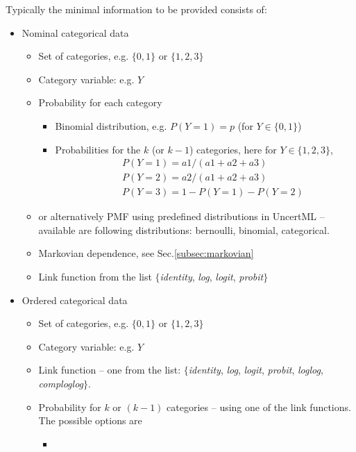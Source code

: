 Typically the minimal information to be provided consists of:
\begin{itemize}
\item
Nominal categorical data 
\begin{itemize}
\item
Set of categories, e.g. $\{0,1\}$ or $\{1,2,3\}$
\item
Category variable: e.g. $Y$
\item
Probability for each category
\begin{itemize}
\item
Binomial distribution, e.g. $P(Y=1) = p$ (for $Y \in \{0,1\}$) 
\item
Probabilities for the $k$ (or $k-1$) categories, here for $Y \in \{1,2,3\}$, 
\begin{eqnarray}
&&P(Y=1)=a1/(a1+a2+a3) \nonumber \\
&&P(Y=2)=a2/(a1+a2+a3)  \nonumber \\
&&P(Y=3)=1-P(Y=1)-P(Y=2) \nonumber
\end{eqnarray}
\end{itemize}
\item
or alternatively PMF using predefined distributions in UncertML -- available are following distributions: 
bernoulli, binomial, categorical.
\item
Markovian dependence, see Sec.\ref{subsec:markovian}
\item
Link function from the list $\{$\emph{identity}, \emph{log}, \emph{logit}, \emph{probit}$\}$
\end{itemize}
\item
Ordered categorical data
\begin{itemize}
\item
Set of categories, e.g. $\{0,1\}$ or $\{1,2,3\}$
\item
Category variable: e.g. $Y$
\item
Link function -- one from the list: $\{$\emph{identity}, \emph{log}, \emph{logit}, \emph{probit}, \emph{loglog}, \emph{comploglog}$\}$. 
\item
Probability for $k$ or $(k - 1)$ categories -- using one of the link functions. The possible options are 
\begin{itemize}
\item

\end{itemize}
\end{itemize}
\end{itemize}
